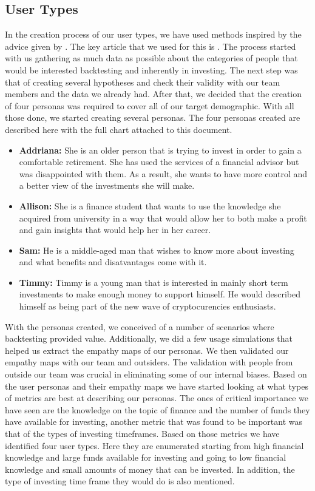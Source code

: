 \documentclass[main.tex]{subfiles}
\begin{document}
\subsection{User Types}
In the creation process of our user types, we have used methods inspired by the advice given by \cite{uiux_fundation}. The key article that we used for this is \cite{user_types_interaction_design_fundation}. The process started with us gathering as much data as possible about the categories of people that would be interested backtesting and inherently in investing. The next step was that of creating several hypotheses and check their validity with our team members and the data we already had. After that, we decided that the creation of four personas was required to cover all of our target demographic. With all those done, we started creating several personas. 
The four personas created are described here with the full chart attached to this document.
\begin{itemize}
\item \textbf{Addriana: }She is an older person that is trying to invest in order to gain a comfortable retirement. She has used the services of a financial advisor but was disappointed with them. As a result, she wants to have more control and a better view of the investments she will make.
\item \textbf{Allison: }She is a finance student that wants to use the knowledge she acquired from university in a way that would allow her to both make a profit and gain insights that would help her in her career.
\item\textbf{Sam: }He is a middle-aged man that wishes to know more about investing and what benefits and disatvantages come with it. 
\item\textbf{Timmy: }Timmy is a young man that is interested in mainly short term investments to make enough money to support himself. He would described himself as being part of the new wave of cryptocurencies enthusiasts.
\end{itemize}

With the personas created, we conceived of a number of scenarios where backtesting provided value. Additionally,  we did a few usage simulations that helped us extract the empathy maps of our personas. We then validated our empathy maps with our team and outsiders. The validation with people from outside our team was crucial in eliminating some of our internal biases.
Based on the user personas and their empathy maps we have started looking at what types of metrics are best at describing our personas. The ones of critical importance we have seen are the knowledge on the topic of finance and the number of funds they have available for investing, another metric that was found to be important was that of the types of investing timeframes. Based on those metrics we have identified four user types. Here they are enumerated starting from high financial knowledge and large funds available for investing and going to low financial knowledge and small amounts of money that can be invested. In addition, the type of investing time frame they would do is also mentioned.
\end{document}
